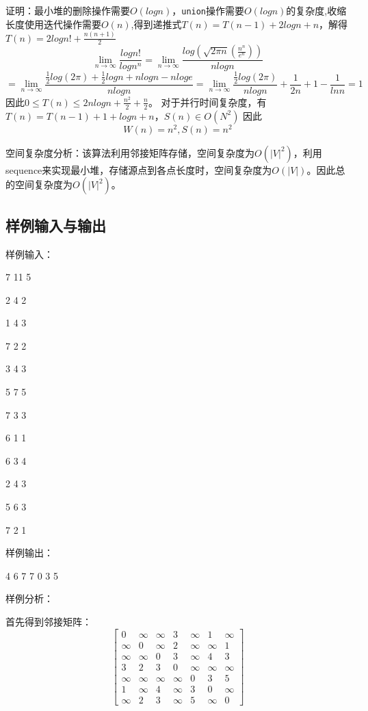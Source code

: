 \documentclass[UTF8,a4paperdui, %
]{ctexart}
\begin{document}
证明：最小堆的删除操作需要$O(logn)$，\texttt{union}操作需要$O(logn)$的复杂度,收缩长度使用迭代操作需要$O(n)$,得到递推式$T(n)=T(n-1)+2logn+n$，解得$T(n)=2logn!+\frac{n(n+1)}{2}$
\[
\lim\limits_{n\rightarrow \infty}{\frac{logn!}{logn^n}}=\lim\limits_{n\rightarrow \infty}{\frac{log(\sqrt{2\pi n}(\frac{n^n}{e^n}))}{nlogn}}
\]
\[=\lim\limits_{n\rightarrow \infty}{\frac{\frac{1}{2}log(2\pi)+\frac{1}{2}logn+nlogn-nloge}{nlogn}}=\lim\limits_{n\rightarrow \infty}{\frac{\frac{1}{2}log(2\pi)}{nlogn}+\frac{1}{2n}+1-\frac{1}{lnn}}=1
\]
因此$0\leq T(n)\leq 2nlogn+\frac{n^2}{2}+\frac{n}{2}$。
对于并行时间复杂度，有$T(n)=T(n-1)+1+logn+n$，$S(n)\in O(N^2)$
因此
\[
W(n)=n^2,S(n)=n^2
\]

空间复杂度分析：该算法利用邻接矩阵存储，空间复杂度为$O(|V|^2)$，利用sequence来实现最小堆，存储源点到各点长度时，空间复杂度为$O(|V|)$。因此总的空间复杂度为$O(|V|^2)$。

\subsection{样例输入与输出}
样例输入：

7 11 5

2 4 2

1 4 3

7 2 2

3 4 3

5 7 5

7 3 3

6 1 1

6 3 4

2 4 3

5 6 3

7 2 1

样例输出：

4 6 7 7 0 3 5 

样例分析：

首先得到邻接矩阵：
\[
\left[
    \begin{array}{ccccccc}
        0 & \infty & \infty & 3 & \infty & 1 & \infty \\
        \infty & 0 & \infty & 2 & \infty & \infty & 1 \\
        \infty & \infty & 0 & 3 & \infty & 4 & 3 \\
        3 & 2 & 3 & 0 & \infty & \infty & \infty \\
        \infty & \infty & \infty & \infty & 0 & 3 & 5 \\
        1 & \infty & 4 & \infty & 3 & 0 & \infty \\
        \infty & 2 & 3 & \infty & 5 & \infty & 0
    \end{array}
\right]
\]
\end{document}
